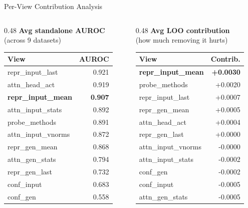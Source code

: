 \documentclass[aspectratio=169,14pt]{beamer}
\begin{document}
\begin{frame}{Per-View Contribution Analysis}

\begin{columns}[T]
\begin{column}{0.48\textwidth}
\textbf{Avg standalone AUROC}\\{\small (across 9 datasets)}

\vspace{0.3em}
\small
\begin{tabular}{l r}
\toprule
\textbf{View} & \textbf{AUROC} \\
\midrule
repr\_input\_last & 0.921 \\
attn\_head\_act & 0.919 \\
\textcolor{primary}{\textbf{repr\_input\_mean}} & \textcolor{primary}{\textbf{0.907}} \\
attn\_input\_stats & 0.892 \\
probe\_methods & 0.891 \\
attn\_input\_vnorms & 0.872 \\
\textcolor{primary}{repr\_gen\_mean} & \textcolor{primary}{0.868} \\
attn\_gen\_stats & 0.794 \\
repr\_gen\_last & 0.732 \\
conf\_input & 0.683 \\
conf\_gen & 0.558 \\
\bottomrule
\end{tabular}
\end{column}

\begin{column}{0.48\textwidth}
\textbf{Avg LOO contribution}\\{\small (how much removing it hurts)}

\vspace{0.3em}
\small
\begin{tabular}{l r}
\toprule
\textbf{View} & \textbf{Contrib.} \\
\midrule
\textcolor{primary}{\textbf{repr\_input\_mean}} & \textcolor{wingreen}{\textbf{+0.0030}} \\
probe\_methods & +0.0020 \\
repr\_input\_last & +0.0007 \\
repr\_gen\_mean & +0.0005 \\
attn\_head\_act & +0.0004 \\
\midrule
repr\_gen\_last & +0.0000 \\
attn\_input\_vnorms & -0.0000 \\
attn\_input\_stats & -0.0002 \\
conf\_gen & -0.0002 \\
conf\_input & -0.0005 \\
attn\_gen\_stats & -0.0005 \\
\bottomrule
\end{tabular}
\end{column}
\end{columns}


\end{frame}
\end{document}

